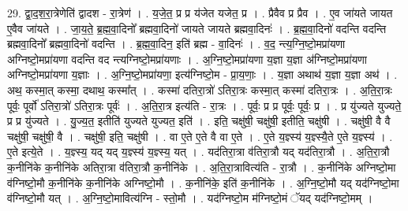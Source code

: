 \documentclass[17pt]{extarticle}
\begin{document}
29. द्वा॒द॒श॒रा॒त्रेणेति॑ द्वादश - रा॒त्रेण॑ । . य॒जे॒त॒ प्र प्र य॑जेत यजेत॒ प्र । . प्रैवैव प्र प्रैव । . ए॒व जा॑यते जायत ए॒वैव जा॑यते । . जा॒य॒ते॒ ब्र॒ह्म॒वा॒दिनो᳚ ब्रह्मवा॒दिनो॑ जायते जायते ब्रह्मवा॒दिनः॑ । . ब्र॒ह्म॒वा॒दिनो॑ वदन्ति वदन्ति ब्रह्मवा॒दिनो᳚ ब्रह्मवा॒दिनो॑ वदन्ति । . ब्र॒ह्म॒वा॒दिन॒ इति॑ ब्रह्म - वा॒दिनः॑ । . व॒द॒ न्त्य॒ग्नि॒ष्टो॒मप्रा॑यणा अग्निष्टो॒मप्रा॑यणा वदन्ति वद न्त्यग्निष्टो॒मप्रा॑यणाः । . अ॒ग्नि॒ष्टो॒मप्रा॑यणा य॒ज्ञा य॒ज्ञा अ॑ग्निष्टो॒मप्रा॑यणा अग्निष्टो॒मप्रा॑यणा य॒ज्ञाः । . अ॒ग्नि॒ष्टो॒मप्रा॑यणा॒ इत्य॑ग्निष्टो॒म - प्रा॒य॒णाः॒ । . य॒ज्ञा अथाथ॑ य॒ज्ञा य॒ज्ञा अथ॑ । . अथ॒ कस्मा॒त् कस्मा॒ दथाथ॒ कस्मा᳚त् । . कस्मा॑ दतिरा॒त्रो॑ ऽतिरा॒त्रः कस्मा॒त् कस्मा॑ दतिरा॒त्रः । . अ॒ति॒रा॒त्रः पूर्वः॒ पूर्वो॑ ऽतिरा॒त्रो॑ ऽतिरा॒त्रः पूर्वः॑ । . अ॒ति॒रा॒त्र इत्य॑ति - रा॒त्रः । . पूर्वः॒ प्र प्र पूर्वः॒ पूर्वः॒ प्र । . प्र यु॑ज्यते युज्यते॒ प्र प्र यु॑ज्यते । . यु॒ज्य॒त॒ इतीति॑ युज्यते युज्यत॒ इति॑ । . इति॒ चक्षु॑षी॒ चक्षु॑षी॒ इतीति॒ चक्षु॑षी । . चक्षु॑षी॒ वै वै चक्षु॑षी॒ चक्षु॑षी॒ वै । . चक्षु॑षी॒ इति॒ चक्षु॑षी । . वा ए॒ते ए॒ते वै वा ए॒ते । . ए॒ते य॒ज्ञ्स्य॑ य॒ज्ञ्स्यै॒ते ए॒ते य॒ज्ञ्स्य॑ । . ए॒ते इत्ये॒ते । . य॒ज्ञ्स्य॒ यद् यद् य॒ज्ञ्स्य॑ य॒ज्ञ्स्य॒ यत् । . यद॑तिरा॒त्रा व॑तिरा॒त्रौ यद् यद॑तिरा॒त्रौ । . अ॒ति॒रा॒त्रौ क॒नीनि॑के क॒नीनि॑के अतिरा॒त्रा व॑तिरा॒त्रौ क॒नीनि॑के । . अ॒ति॒रा॒त्रावित्य॑ति - रा॒त्रौ । . क॒नीनि॑के अग्निष्टो॒मा व॑ग्निष्टो॒मौ क॒नीनि॑के क॒नीनि॑के अग्निष्टो॒मौ । . क॒नीनि॑के॒ इति॑ क॒नीनि॑के । . अ॒ग्नि॒ष्टो॒मौ यद् यद॑ग्निष्टो॒मा व॑ग्निष्टो॒मौ यत् । . अ॒ग्नि॒ष्टो॒मावित्य॑ग्नि - स्तो॒मौ । . यद॑ग्निष्टो॒म म॑ग्निष्टो॒मं ॅयद् यद॑ग्निष्टो॒मम् । \newline
\end{document}
